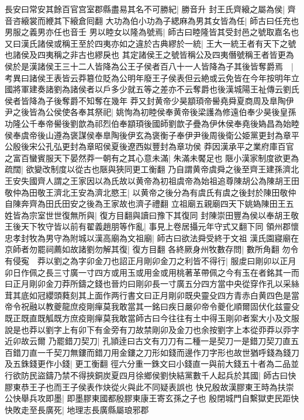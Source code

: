 長安曰常安其餘百官宫室郡縣盡易其名不可勝紀|{
	勝音升}
封王氏齊縗之屬為侯|{
	齊音咨縗裳而緶其下縗倉囘翻}
大功為伯小功為子緦麻為男其女皆為任|{
	師古曰任充也男服之義男亦任也音壬}
男以睦女以隆為號焉|{
	師古曰睦隆皆其受封邑之號取嘉名也}
又曰漢氏諸侯或稱王至於四夷亦如之違於古典繆於一統|{
	王大一統王者有天下之號也諸侯及四夷稱之非古也繆戾也}
其定諸侯王之號皆稱公及四夷僭號稱王者皆更為侯於是漢諸侯王三十二人皆降為公王子侯者百八十一人皆降為子其後皆奪爵焉　|{
	考異曰諸侯王表皆云莽簒位貶為公明年廢王子侯表但云絶或云免皆在今年按明年立國將軍建奏諸劉為諸侯者以戶多少就五等之差亦不云奪爵也後漢城陽王祉傳云劉氏侯者皆降為子後奪爵不知奪在幾年}
莽又封黄帝少昊顓頊帝嚳堯舜夏商周及臯陶伊尹之後皆為公侯使各奉其祭祀|{
	姚恂為初睦侯奉黄帝後梁護為修遠伯奉少昊後皇孫功隆公千奉帝嚳後劉歆為祁烈伯奉顓頊後國師劉歆子疊為伊休侯奉堯後媯昌為始睦侯奉虞帝後山遵為褒謀侯奉臯陶後伊玄為褒衡子奉伊尹後周後衛公姫黨更封為章平公殷後宋公孔弘更封為章昭侯夏後遼西姒豐封為章功侯}
莽因漢承平之業府庫百官之富百蠻賓服天下晏然莽一朝有之其心意未滿|{
	朱滿未饜足也}
陿小漢家制度欲更為疏闊|{
	欲變改制度以從古也陿與狹同更工衡翻}
乃自謂黄帝虞舜之後至齊王建孫濟北王安失國齊人謂之王家因以為氏故以黄帝為初祖虞帝為始祖追尊陳胡公為陳胡王田敬仲為田敬王濟北王安為濟北愍王|{
	以黄帝之後分為有虞氏有虞之後封於陳田敬仲自陳奔齊為田氏田安之後為王家故也濟子禮翻}
立祖廟五親廟四天下姚媯陳田王五姓皆為宗室世世復無所與|{
	復方目翻與讀曰豫下其復同}
封陳崇田豐為侯以奉胡王敬王後天下牧守皆以前有翟義趙朋等作亂|{
	事見上卷居攝元年守式又翻下同}
領州郡懷忠孝封牧為男守為附城以漢高廟為文祖廟|{
	師古曰欲法舜受終于文祖}
漢氏園寢廟在京師者勿罷祠薦如故諸劉勿解其復|{
	復方目翻}
各終厥身州牧數存問|{
	數所角翻}
勿令有侵寃　莽以劉之為字卯金刀也詔正月剛卯金刀之利皆不得行|{
	服䖍曰剛卯以正月卯日作佩之長三寸廣一寸四方或用玉或用金或用桃著革帶佩之今有玉在者銘其一而曰正月剛卯金刀莽所鑄之錢也晉灼曰剛卯長一寸廣五分四方當中央從穿作孔以采絲茸其底如冠纓頭蕤刻其上面作两行書文曰正月剛卯既央靈殳四方青赤白黄四色是當帝令祝融以教夔龍庶疫剛癉莫我敢當其一銘曰疾日嚴卯帝令夔化順爾固伏化兹靈殳既正既直既觚既方庶疫剛癉莫我敢當師古曰今往往有土中得玉剛卯者案大小及文服說是也莽以劉字上有卯下有金旁有刀故禁剛卯及金刀也余按劉字上本從丣莽以丣字近卯故云爾}
乃罷錯刀契刀|{
	孔頴逹曰古文有刀刀有二種一是契刀一是錯刀契刀直五百錯刀直一千契刀無鏤而錯刀用金鏤之刀形如錢而邊作刀字形也故世猶呼錢為錢刀}
及五銖錢更作小錢|{
	更工衡翻}
徑六分重一銖文曰小錢直一與前大錢五十者為二品並行欲防民盜鑄乃禁不得挾銅炭夏四月徐鄉侯劉快結黨數千人起兵於其國|{
	師古曰快膠東恭王子也而王子侯表作炔從火與此不同疑表誤也}
快兄殷故漢膠東王時為扶崇公快舉兵攻即墨|{
	即墨膠東國都殷膠東康王寄玄孫之子也}
殷閉城門自繫獄吏民距快快敗走至長廣死|{
	地理志長廣縣屬琅邪郡}
